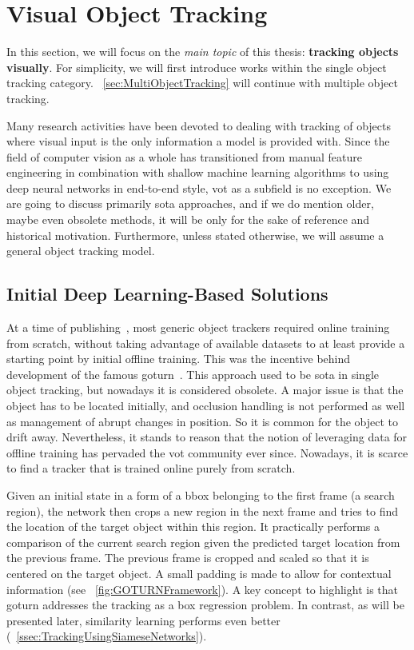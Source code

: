 \section{Visual Object Tracking}
\label{sec:VisualObjectTracking}

In this section, we will focus on the \emph{main topic} of this thesis: \textbf{tracking objects visually}. For simplicity, we will first introduce works within the single object tracking category. \sectionstr{}~\ref{sec:MultiObjectTracking} will continue with multiple object tracking.

Many research activities have been devoted to dealing with tracking of objects where visual input is the only information a model is provided with. Since the field of computer vision as a whole has transitioned from manual feature engineering in combination with shallow machine learning algorithms to using deep neural networks in end-to-end style, \gls{vot} as a subfield is no exception. We are going to discuss primarily \gls{sota} approaches, and if we do mention older, maybe even obsolete methods, it will be only for the sake of reference and historical motivation. Furthermore, unless stated otherwise, we will assume a general object tracking model.

\subsection{Initial Deep Learning-Based Solutions}
\label{ssec:InitialDeepLearningBasedSolutions}

At a time of publishing~\cite{held2016goturn}, most generic object trackers required online training from scratch, without taking advantage of available datasets to at least provide a starting point by initial offline training. This was the incentive behind development of the famous \gls{goturn}~\cite{held2016goturn}. This approach used to be \gls{sota} in single object tracking, but nowadays it is considered obsolete. A major issue is that the object has to be located initially, and occlusion handling is not performed as well as management of abrupt changes in position. So it is common for the object to drift away. Nevertheless, it stands to reason that the notion of leveraging data for offline training has pervaded the \gls{vot} community ever since. Nowadays, it is scarce to find a tracker that is trained online purely from scratch.

Given an initial state in a form of a \gls{bbox} belonging to the first frame (a search region), the network then crops a new region in the next frame and tries to find the location of the target object within this region. It practically performs a comparison of the current search region given the predicted target location from the previous frame. The previous frame is cropped and scaled so that it is centered on the target object. A small padding is made to allow for contextual information (see \figstr{}~\ref{fig:GOTURNFramework}). A key concept to highlight is that \gls{goturn} addresses the tracking as a box regression problem. In contrast, as will be presented later, similarity learning performs even better (\sectionstr{}~\ref{ssec:TrackingUsingSiameseNetworks}).

